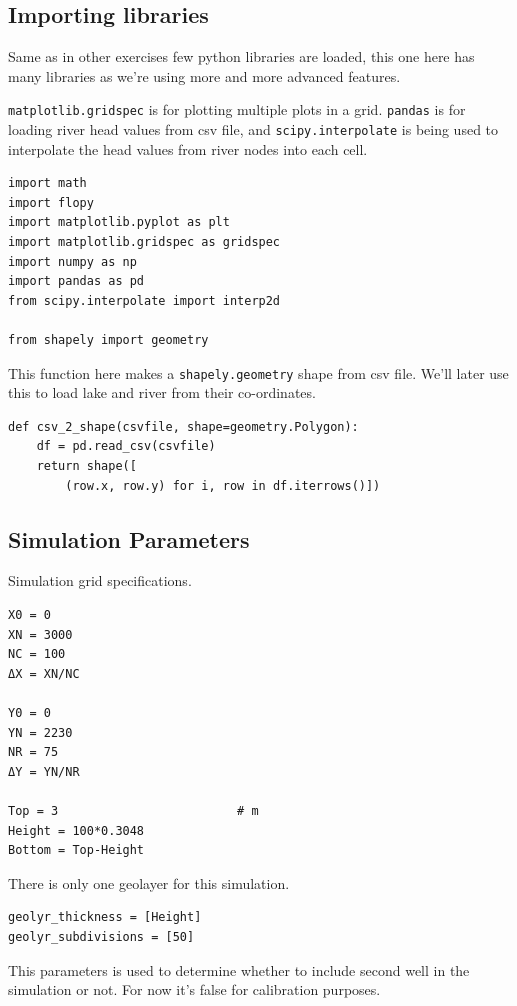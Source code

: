 \documentclass[titlepage,12pt]{unisubmission}
\begin{document}
\subsection{Importing libraries}
\label{sec:org92e5f0e}
Same as in other exercises few python libraries are loaded, this one here has many libraries as we're using more and more advanced features.

\texttt{matplotlib.gridspec} is for plotting multiple plots in a grid. \texttt{pandas} is for loading river head values from csv file, and \texttt{scipy.interpolate} is being used to interpolate the head values from river nodes into each cell.

\begin{verbatim}
import math
import flopy
import matplotlib.pyplot as plt
import matplotlib.gridspec as gridspec
import numpy as np
import pandas as pd
from scipy.interpolate import interp2d

from shapely import geometry
\end{verbatim}


This function here makes a \texttt{shapely.geometry} shape from csv file. We'll later use this to load lake and river from their co-ordinates.

\begin{verbatim}
def csv_2_shape(csvfile, shape=geometry.Polygon):
    df = pd.read_csv(csvfile)
    return shape([
        (row.x, row.y) for i, row in df.iterrows()])
\end{verbatim}

\subsection{Simulation Parameters}
\label{sec:org5e6a174}
Simulation grid specifications.

\begin{verbatim}
X0 = 0
XN = 3000
NC = 100
ΔX = XN/NC

Y0 = 0
YN = 2230
NR = 75
ΔY = YN/NR

Top = 3                         # m
Height = 100*0.3048
Bottom = Top-Height
\end{verbatim}

There is only one geolayer for this simulation.

\begin{verbatim}
geolyr_thickness = [Height]
geolyr_subdivisions = [50]
\end{verbatim}

This parameters is used to determine whether to include second well in the simulation or not. For now it's false for calibration purposes.
\end{document}
